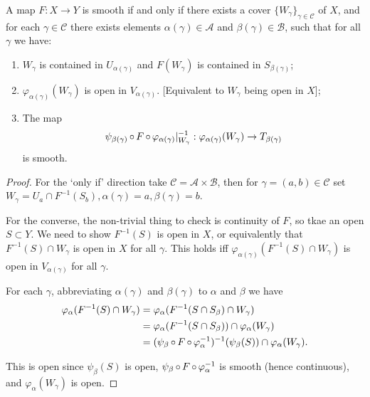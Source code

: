 \documentclass[a4paper,11pt]{article}
\begin{document}
	\begin{prop} \label{prop:1.41}
		A map $F: X\to Y$ is smooth if and only if there exists a cover $\{W_\gamma\}_{\gamma \in \mathcal{C}}$ of $X$, and for each $\gamma \in \mathcal{C}$ there exists elements $\alpha(\gamma) \in \mathcal{A}$ and $\beta(\gamma) \in \mathcal{B}$, such that for all $\gamma$ we have:
		\begin{enumerate}
			\item $W_\gamma$ is contained in $U_{\alpha(\gamma)}$ and $F(W_\gamma)$ is contained in $S_{\beta(\gamma)}$;
			\item $\varphi_{\alpha(\gamma)}(W_\gamma)$ is open in $V_{\alpha(\gamma)}$. [Equivalent to $W_\gamma$ being open in $X$];
			\item The map \[
				\psi_{\beta(\gamma)} \operatorname{\circ} F \operatorname{\circ} \varphi_{\alpha(\gamma)}|_{W_\gamma}^{-1} : \varphi_{\alpha(\gamma)}(W_\gamma) \to T_{\beta(\gamma)}
			\]
			is smooth.
		\end{enumerate}  
	\end{prop}
	\begin{proof}
		For the `only if' direction take $\mathcal{C} = \mathcal{A}\times \mathcal{B}$, then for $\gamma = (a,b) \in \mathcal{C}$ set $W_\gamma = U_a \cap F^{-1}(S_b), \alpha(\gamma) = a, \beta(\gamma) = b$.
		
		For the converse, the non-trivial thing to check is continuity of $F$, so tkae an open $S \subset Y$. We need to show $F^{-1}(S)$ is open in $X$, or equivalently that $F^{-1}(S) \cap W_\gamma$ is open in $X$ for all $\gamma$. This holds iff $\varphi_{\alpha(\gamma)} (F^{-1}(S)\cap W_\gamma)$ is open in $V_{\alpha(\gamma)}$ for all $\gamma$.
		
		For each $\gamma$, abbreviating $\alpha(\gamma)$ and $\beta(\gamma)$ to $\alpha$ and $\beta$ we have
		\begin{align*}
			\varphi_\alpha (F^{-1}(S) \cap W_\gamma) & = \varphi_\alpha (F^{-1}(S \cap S_\beta) \cap W_\gamma) \\
			& = \varphi_\alpha (F^{-1} (S \cap S_\beta)) \cap \varphi_\alpha(W_\gamma) \\
			& = (\psi_\beta \operatorname{\circ} F \operatorname{\circ} \varphi_\alpha^{-1})^{-1} (\psi_\beta (S)) \cap \varphi_\alpha(W_\gamma).
		\end{align*}

		This is open since $\psi_\beta(S)$ is open, $\psi_\beta \operatorname{\circ} F \operatorname{\circ} \varphi_\alpha^{-1}$ is smooth (hence continuous), and $\varphi_\alpha (W_\gamma)$ is open.
	\end{proof}
\end{document}
